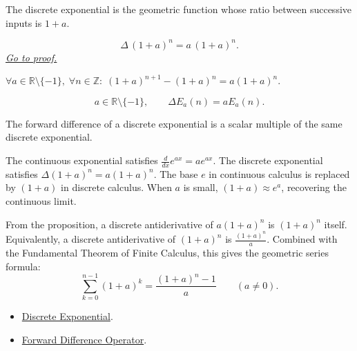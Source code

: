 \begin{remark*}[Interpretation]
The discrete exponential is the geometric function whose ratio between
successive inputs is \(1+a\).
\end{remark*}

\begin{proposition}
\label{prop:discrete-exponential-rule}
\[
\Delta\,(1+a)^n = a\,(1+a)^n.
\]
\hyperref[prf:discrete-exponential-rule]{\textit{Go to proof.}}
\end{proposition}

\begin{remark*}
\(\forall a \in \mathbb{R}\setminus\{-1\},\; \forall n \in \mathbb{Z}:\;
(1+a)^{n+1} - (1+a)^n = a(1+a)^n\).
\end{remark*}

\begin{remark*}
\[
  a\in\mathbb{R}\setminus\{-1\},\qquad
  \Delta E_a(n)=aE_a(n).
\]
\end{remark*}

\begin{remark*}[Interpretation]
The forward difference of a discrete exponential is a scalar multiple of the
same discrete exponential.


The continuous exponential satisfies \(\tfrac{d}{dx}e^{ax} = ae^{ax}\).
The discrete exponential satisfies \(\Delta(1+a)^n = a(1+a)^n\). The
base \(e\) in continuous calculus is replaced by \((1+a)\) in discrete
calculus. When \(a\) is small, \((1+a) \approx e^a\), recovering the
continuous limit.


From the proposition, a discrete antiderivative of \(a(1+a)^n\) is
\((1+a)^n\) itself. Equivalently, a discrete antiderivative of \((1+a)^n\)
is \(\tfrac{(1+a)^n}{a}\). Combined with the Fundamental Theorem of Finite
Calculus, this gives the geometric series formula:
\[
\sum_{k=0}^{n-1}(1+a)^k
= \frac{(1+a)^n - 1}{a}
\qquad (a \ne 0).
\]
\end{remark*}


\begin{dependencies}
\begin{itemize}
  \item \hyperref[def:discrete-exponential]{Discrete Exponential}.
  \item \hyperref[def:forward-difference]{Forward Difference Operator}.
\end{itemize}
\end{dependencies}
